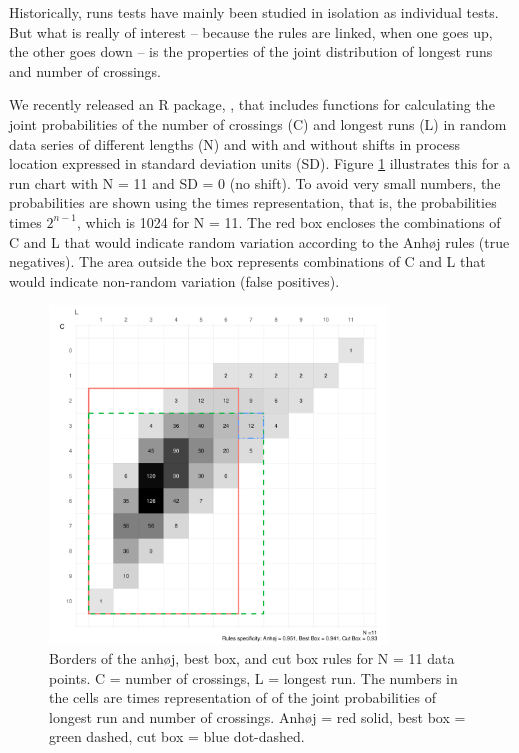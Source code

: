 Historically, runs tests have mainly been studied in isolation as
individual tests. But what is really of interest -- because the rules
are linked, when one goes up, the other goes down -- is the properties
of the joint distribution of longest runs and number of crossings.

We recently released an R package,  \citep{twl2018},
that includes functions for calculating the joint probabilities of the
number of crossings (C) and longest runs (L) in random data series of
different lengths (N) and with and without shifts in process location
expressed in standard deviation units (SD). Figure \ref{figure:box11}
illustrates this for a run chart with N = 11 and SD = 0 (no shift). To
avoid very small numbers, the probabilities are shown using the times
representation, that is, the probabilities times \(2^{n-1}\), which is
1024 for N = 11. The red box encloses the combinations of C and L that
would indicate random variation according to the Anhøj rules (true
negatives). The area outside the box represents combinations of C and L
that would indicate non-random variation (false positives).

\begin{figure}[htbp]
  \centering
  \includegraphics[width=0.8\textwidth]{fig_box11.pdf}
  \caption{Borders of the anhøj, best box, and cut box rules for N = 11 data points. 
           C = number of crossings, L = longest run.
           The numbers in the cells are times representation of of the joint
           probabilities of longest run and number of crossings.
           Anhøj = red solid, best box = green dashed, cut box = blue dot-dashed.}
  \label{figure:box11}
\end{figure}

